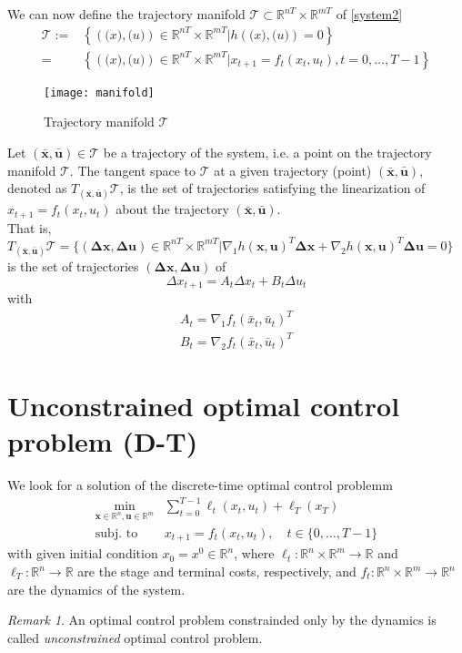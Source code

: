 \documentclass[openany]{book}
\newcommand{\R}{\mathbb{R}}               %
\newcommand{\traj}{(\bar{\mathbf{x}},\bar{\mathbf{u}})}  %
\theoremstyle{definition}
\theoremstyle{remark}
\newtheorem*{remark}{Remark}
\begin{document}
We can now define the trajectory manifold $\mathcal{T}\subset \R^{nT}\times \R^{mT}$ of \eqref{system2}
\begin{align*}
    \mathcal{T} := &\left\{\left(\mathbf(x),\mathbf(u)\right)\in\R^{nT}\times\R^{mT}|h\left(\mathbf(x),\mathbf(u)\right)=0\right\}\\=&\left\{\left(\mathbf(x),\mathbf(u)\right)\in\R^{nT}\times\R^{mT}|x_{t+1}=f_t\left(x_t,u_t\right),t=0,\dots,T-1\right\}
\end{align*}
\begin{figure}[ht]
    \centering
    \texttt{[image: manifold]}
    \caption{Trajectory manifold $\mathcal{T}$}
\end{figure}

Let $\traj\in\mathcal{T}$ be a trajectory of the system, i.e. a point on the trajectory manifold $\mathcal{T}$. The tangent space to $\mathcal{T}$ at a given trajectory (point) $\traj$, denoted as $T_{(\bar{\mathbf{x}},\bar{\mathbf{u}})}\mathcal{T}$, is the set of trajectories satisfying the linearization of $x_{t+1} = f_t(x_t,u_t)$ about the trajectory $(\bar{\mathbf{x}},\bar{\mathbf{u}})$.\\
That is, $T_{(\bar{\mathbf{x}},\bar{\mathbf{u}})}\mathcal{T}=\{(\mathbf{\Delta x, \Delta u})\in\R^{nT}\times\R^{mT}|\nabla_1h(\mathbf{x},\mathbf{u})^T\mathbf{\Delta x} + \nabla_2h(\mathbf{x},\mathbf{u})^T\mathbf{\Delta u} = 0\}$ is the set of trajectories $(\mathbf{\Delta x, \Delta u})$ of
\[
    \Delta x_{t+1} = A_t\Delta x_t + B_t \Delta u_t
\]
with 
\begin{gather*}
    A_t = \nabla_1f_t(\bar{x}_t,\bar{u}_t)^T\\
    B_t = \nabla_2f_t(\bar{x}_t,\bar{u}_t)^T
\end{gather*}

\section{Unconstrained optimal control problem (D-T)}
We look for a solution of the discrete-time optimal control problemm 
\begin{align*}
        \min_{\mathbf{x}\in\R^n,\mathbf{u}\in\R^m} & \displaystyle\sum_{t=0}^{T-1}\ell_t(x_t,u_t)+\ell_T(x_T)\\
        \text{subj. to } & x_{t+1} = f_t(x_t,u_t), \quad t\in\{0,\dots,T-1\} 
\end{align*}
with given initial condition $x_0 = x^0\in \R^n$, where $\ell_t:\R^n\times\R^m\to\R$ and $\ell_T:\R^n\to\R$ are the stage and terminal costs, respectively, and $f_t:\R^n\times\R^m\to\R^n$ are the dynamics of the system.
\begin{remark}
    An optimal control problem constrainded only by the dynamics is called \emph{unconstrained} optimal control problem.
\end{remark}
\end{document}
